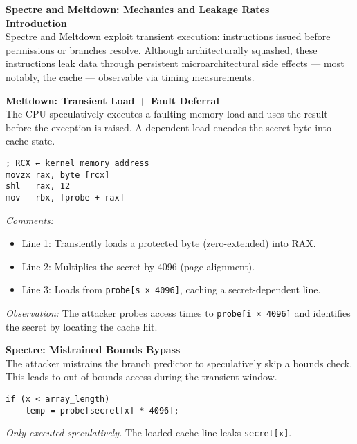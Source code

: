 \begin{technical}
{\Large\textbf{Spectre and Meltdown: Mechanics and Leakage Rates}}\\[0.3em]

\textbf{Introduction}\\[0.5em]
Spectre and Meltdown exploit transient execution: instructions issued before permissions or branches resolve. Although architecturally squashed, these instructions leak data through persistent microarchitectural side effects — most notably, the cache — observable via timing measurements.

\vspace{0.4em}
\textbf{Meltdown: Transient Load + Fault Deferral}\\[0.5em]
The CPU speculatively executes a faulting memory load and uses the result before the exception is raised. A dependent load encodes the secret byte into cache state.

\begin{verbatim}
; RCX ← kernel memory address
movzx rax, byte [rcx]
shl   rax, 12
mov   rbx, [probe + rax]
\end{verbatim}
\vspace{-0.5em}
\textit{Comments:}
\begin{itemize}[noitemsep,topsep=0pt]
\item Line 1: Transiently loads a protected byte (zero-extended) into RAX.
\item Line 2: Multiplies the secret by 4096 (page alignment).
\item Line 3: Loads from \texttt{probe[s × 4096]}, caching a secret-dependent line.
\end{itemize}

\textit{Observation:} The attacker probes access times to \texttt{probe[i × 4096]} and identifies the secret by locating the cache hit.

\vspace{0.4em}
\textbf{Spectre: Mistrained Bounds Bypass}\\[0.5em]
The attacker mistrains the branch predictor to speculatively skip a bounds check. This leads to out-of-bounds access during the transient window.

\begin{verbatim}
if (x < array_length)
    temp = probe[secret[x] * 4096];
\end{verbatim}
\vspace{-0.5em}
\textit{Only executed speculatively.} The loaded cache line leaks \texttt{secret[x]}.


\end{technical}
